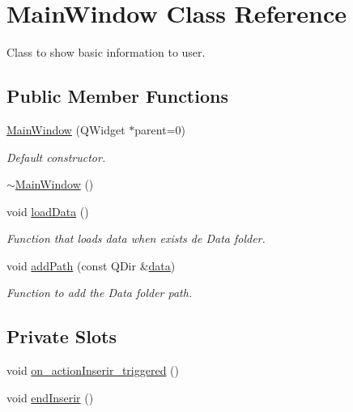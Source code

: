 \hypertarget{class_main_window}{\section{Main\+Window Class Reference}
\label{class_main_window}
}


Class to show basic information to user.  


\subsection*{Public Member Functions}
\begin{DoxyCompactItemize}
\item 
\hyperlink{class_main_window_a8b244be8b7b7db1b08de2a2acb9409db}{Main\+Window} (Q\+Widget $\ast$parent=0)
\begin{DoxyCompactList}\small\item\em Default constructor. \end{DoxyCompactList}\item 
\hyperlink{class_main_window_ae98d00a93bc118200eeef9f9bba1dba7}{$\sim$\+Main\+Window} ()
\item 
void \hyperlink{class_main_window_a6906cd747941813c6da899b18d881473}{load\+Data} ()
\begin{DoxyCompactList}\small\item\em Function that loads data when exists de {\itshape Data} folder. \end{DoxyCompactList}\item 
void \hyperlink{class_main_window_a44d044deed1ddca8952f59554705e28d}{add\+Path} (const Q\+Dir \&\hyperlink{class_main_window_a1dc35bda22acc11636be809539ab73d9}{data})
\begin{DoxyCompactList}\small\item\em Function to add the {\itshape Data} folder path. \end{DoxyCompactList}\end{DoxyCompactItemize}
\subsection*{Private Slots}
\begin{DoxyCompactItemize}
\item 
void \hyperlink{class_main_window_a308a629f351133027a3602d27099cb7c}{on\+\_\+action\+Inserir\+\_\+triggered} ()
\item 
void \hyperlink{class_main_window_a0ab4c2fb4c79e29566e20a0ee60edf77}{end\+Inserir} ()
\end{DoxyCompactItemize}
